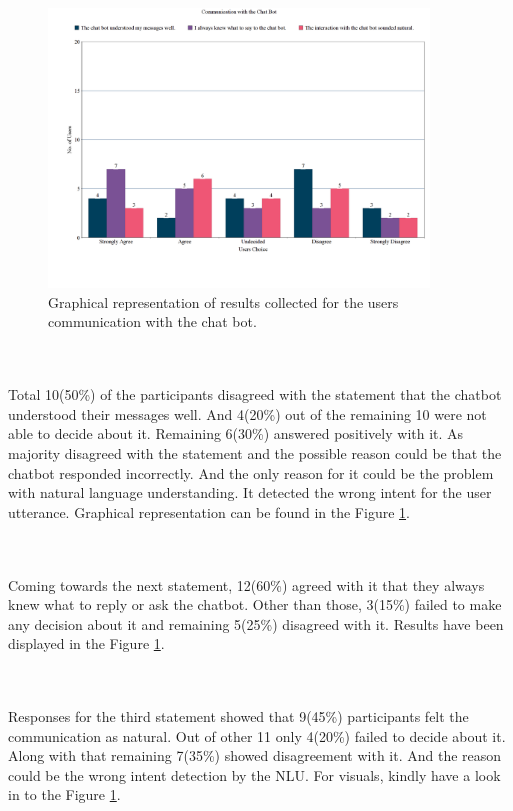 \begin{figure}[!h]
    \centering
    \includegraphics[width=0.9\textwidth]{img/Communication_with_the_Chat_Bot.png}
    \caption{Graphical representation of results collected for the users communication with the chat bot.}
    \label{fig:communwithBot}
\end{figure}
\\~\\
Total 10(50\%) of the participants disagreed with the statement that the chatbot understood their messages well. And 4(20\%) out of the remaining 10 were not able to decide about it. Remaining 6(30\%) answered positively with it. As majority disagreed with the statement and the possible reason could be that the chatbot responded incorrectly. And the only reason for it could be the problem with natural language understanding. It detected the wrong intent for the user utterance. Graphical representation can be found in the Figure \ref{fig:communwithBot}.

\\~\\
Coming towards the next statement, 12(60\%) agreed with it that they always knew what to reply or ask the chatbot. Other than those, 3(15\%) failed to make any decision about it and remaining 5(25\%) disagreed with it. Results have been displayed in the Figure \ref{fig:communwithBot}.

\\~\\
Responses for the third statement showed that 9(45\%) participants felt the communication as natural. Out of other 11 only 4(20\%) failed to decide about it. Along with that remaining 7(35\%) showed disagreement with it. And the reason could be the wrong intent detection by the NLU. For visuals, kindly have a look in to the Figure \ref{fig:communwithBot}.

